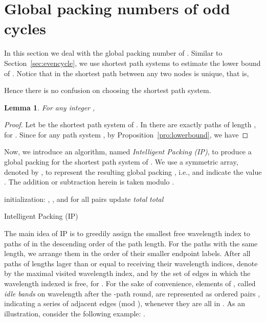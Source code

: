 \documentclass[journal,draftcls,onecolumn,12pt,twoside]{IEEEtran}
\newtheorem{lemma}[theorem]{\bf Lemma}
\begin{document}
\section{Global packing numbers of odd cycles}\label{sec:oddcycle}
In this section we deal with the global packing number of . 
Similar to Section~\ref{sec:evencycle}, we use shortest path systems to estimate the lower bound of .
Notice that in  the shortest path between any two nodes is unique, that is,

Hence there is no confusion on choosing the shortest path system.

\begin{lemma}\label{lemma:cycle_odd_lower}
For any integer , 
\end{lemma}
\begin{proof}
Let  be the shortest path system of .
In  there are exactly  paths of length , for . 
Since  for any path system , by Proposition~\ref{pro:lowerbound}, we have

\end{proof}

Now, we introduce an algorithm, named \emph{Intelligent Packing (IP)}, to produce a global packing for the shortest path system of .
We use a  symmetric array, denoted by , to represent the resulting global packing , i.e.,  and  indicate the value .
The addition or subtraction herein is taken modulo .

\medskip

\begin{algorithm}\SetAlgoLined
  initialization: , , and  for all pairs  \;
  \While{}
  {
    \For{}
 	{
 	}
 	update \emph{total} \;
    \;
  }
    \Return \emph{total} \;
  \caption{Intelligent Packing (IP)}
  \label{alg:GGP}
\end{algorithm}

\medskip

The main idea of IP is to greedily assign the smallest free wavelength index to paths of  in the descending order of the path length.
For the paths with the same length, we arrange them in the order of their smaller endpoint labels.
After all paths of lengths lager than or equal to  receiving their wavelength indices, denote by  the maximal visited wavelength index, and by  the set of edges in which the wavelength indexed  is free, for .
For the sake of convenience, elements of , called \emph{idle bands} on wavelength  after the -path round, are represented as ordered pairs , indicating a series of adjacent edges  (mod ), whenever they are all in .
As an illustration, consider the following example: .
\end{document}

